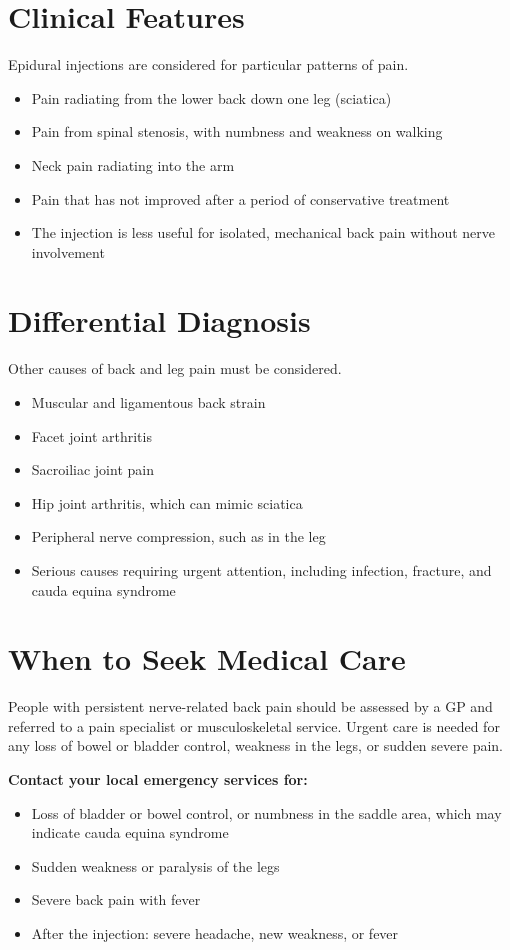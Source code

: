 \section*{Clinical Features}
Epidural injections are considered for particular patterns of pain.
\begin{itemize}
    \item Pain radiating from the lower back down one leg (sciatica)
    \item Pain from spinal stenosis, with numbness and weakness on walking
    \item Neck pain radiating into the arm
    \item Pain that has not improved after a period of conservative treatment
    \item The injection is less useful for isolated, mechanical back pain without nerve involvement
\end{itemize}

\section*{Differential Diagnosis}
Other causes of back and leg pain must be considered.
\begin{itemize}
    \item Muscular and ligamentous back strain
    \item Facet joint arthritis
    \item Sacroiliac joint pain
    \item Hip joint arthritis, which can mimic sciatica
    \item Peripheral nerve compression, such as in the leg
    \item Serious causes requiring urgent attention, including infection, fracture, and cauda equina syndrome
\end{itemize}

\section*{When to Seek Medical Care}
People with persistent nerve-related back pain should be assessed by a GP and referred to a pain specialist or musculoskeletal service. Urgent care is needed for any loss of bowel or bladder control, weakness in the legs, or sudden severe pain.

\textbf{Contact your local emergency services for:}
\begin{itemize}
    \item Loss of bladder or bowel control, or numbness in the saddle area, which may indicate cauda equina syndrome
    \item Sudden weakness or paralysis of the legs
    \item Severe back pain with fever
    \item After the injection: severe headache, new weakness, or fever
\end{itemize}

